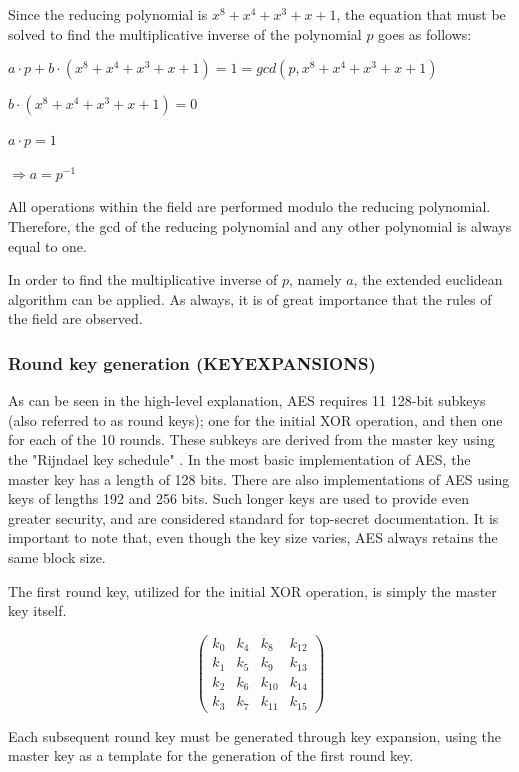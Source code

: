 \documentclass[12pt]{report}
\theoremstyle{definition}
\theoremstyle{remark}
\begin{document}
Since the reducing polynomial is $x^8+x^4+x^3+x+1$, the equation that must be solved to find the multiplicative inverse of the polynomial $p$ goes as follows:

$a \cdot p+b \cdot (x^8+x^4+x^3+x+1) = 1 = gcd(p, x^8+x^4+x^3+x+1)$

$b \cdot ( x^8+x^4+x^3+x+1) = 0$

$a \cdot p = 1$

$\Rightarrow a = p^{-1}$

All operations within the field are performed modulo the reducing polynomial. Therefore, the gcd of the reducing polynomial and any other polynomial is always equal to one.

In order to find the multiplicative inverse of $p$, namely $a$, the extended euclidean algorithm can be applied. As always, it is of great importance that the rules of the field are observed.

\subsubsection{Round key generation (KEYEXPANSIONS)}
As can be seen in the high-level explanation, AES requires 11 128-bit subkeys (also referred to as round keys); one for the initial XOR operation, and then one for each of the 10 rounds. These subkeys are derived from the master key using the "Rijndael key schedule" \cite{KeySchedule}. In the most basic implementation of AES, the master key has a length of 128 bits. There are also implementations of AES using keys of lengths 192 and 256 bits. Such longer keys are used to provide even greater security, and are considered standard for top-secret documentation\cite{CNSSPolicy}. It is important to note that, even though the key size varies, AES always retains the same block size.

The first round key, utilized for the initial XOR operation, is simply the master key itself.

\[ \left( \begin{array}{cccc}
k_0 & k_4 & k_8 & k_{12} \\
k_1 & k_5 & k_9 & k_{13} \\
k_2 & k_6 & k_{10} & k_{14} \\
k_3 & k_7 & k_{11} & k_{15}\end{array} \right)\] 

Each subsequent round key must be generated through key expansion, using the master key as a template for the generation of the first round key.
\end{document}
